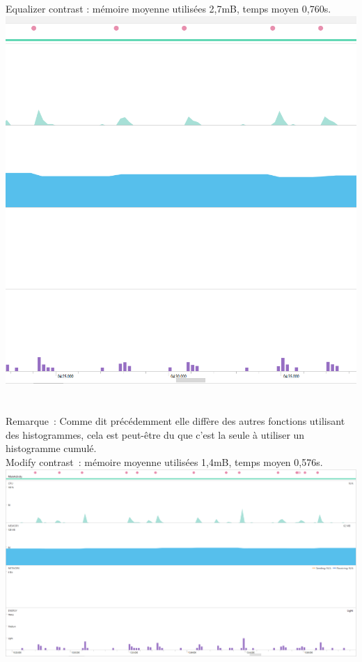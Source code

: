 \documentclass[12pt]{article}
\begin{document}
    Equalizer contrast : mémoire moyenne utilisées 2,7mB, temps moyen 0,760s.\\





    \includegraphics{egalisateur}
    \\
\\
\\


    Remarque :
    Comme dit précédemment elle diffère des autres fonctions utilisant des histogrammes, cela est peut-être du que c'est la seule à utiliser un histogramme cumulé.\\


    Modify contrast : mémoire moyenne utilisées 1,4mB, temps moyen 0,576s.\\



    \includegraphics{modifycontrast}
\end{document}
